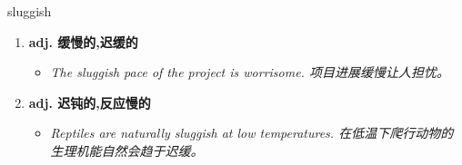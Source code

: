 
\begin{frame}
{\huge sluggish}
\begin{center}
\begin{enumerate}\Large
  \item \textbf{adj. 缓慢的,迟缓的}
  \begin{itemize}
    \item \em{\Large{The sluggish pace of the project is worrisome. 项目进展缓慢让人担忧。}}
  \end{itemize}
  \item \textbf{adj. 迟钝的,反应慢的}
  \begin{itemize}
    \item \em{\Large{Reptiles are naturally sluggish at low temperatures. 在低温下爬行动物的生理机能自然会趋于迟缓。}}
  \end{itemize}
\end{enumerate}
\end{center}
\end{frame}
